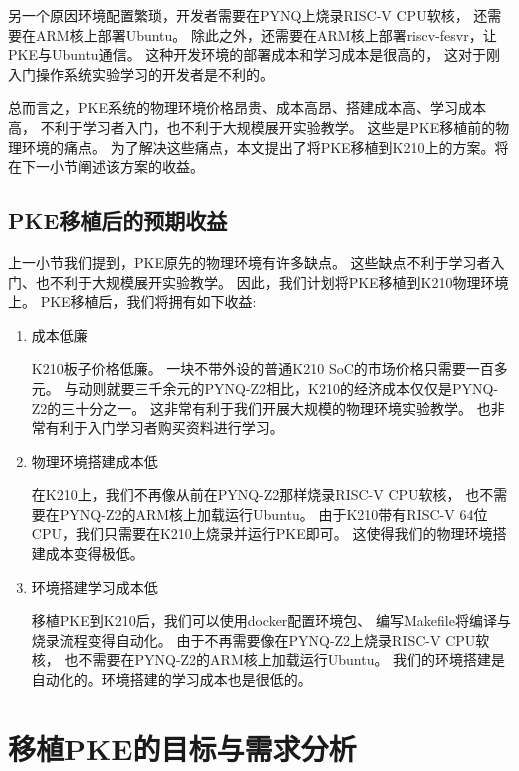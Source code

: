 另一个原因环境配置繁琐，开发者需要在PYNQ上烧录RISC-V CPU软核，
还需要在ARM核上部署Ubuntu。
除此之外，还需要在ARM核上部署riscv-fesvr，让PKE与Ubuntu通信。
这种开发环境的部署成本和学习成本是很高的，
这对于刚入门操作系统实验学习的开发者是不利的。

总而言之，PKE系统的物理环境价格昂贵、成本高昂、搭建成本高、学习成本高，
不利于学习者入门，也不利于大规模展开实验教学。
这些是PKE移植前的物理环境的痛点。
为了解决这些痛点，本文提出了将PKE移植到K210上的方案。将在下一小节阐述该方案的收益。

\subsection{PKE移植后的预期收益}

上一小节我们提到，PKE原先的物理环境有许多缺点。
这些缺点不利于学习者入门、也不利于大规模展开实验教学。
因此，我们计划将PKE移植到K210物理环境上。
PKE移植后，我们将拥有如下收益:

\begin{enumerate}
    \item 成本低廉
    
    K210板子价格低廉。
    一块不带外设的普通K210 SoC的市场价格只需要一百多元。
    与动则就要三千余元的PYNQ-Z2相比，K210的经济成本仅仅是PYNQ-Z2的三十分之一。
    这非常有利于我们开展大规模的物理环境实验教学。
    也非常有利于入门学习者购买资料进行学习。

    \item 物理环境搭建成本低
    
    在K210上，我们不再像从前在PYNQ-Z2那样烧录RISC-V CPU软核，
    也不需要在PYNQ-Z2的ARM核上加载运行Ubuntu。
    由于K210带有RISC-V 64位CPU，我们只需要在K210上烧录并运行PKE即可。
    这使得我们的物理环境搭建成本变得极低。

    \item 环境搭建学习成本低
    
    移植PKE到K210后，我们可以使用docker配置环境包、
    编写Makefile将编译与烧录流程变得自动化。
    由于不再需要像在PYNQ-Z2上烧录RISC-V CPU软核，
    也不需要在PYNQ-Z2的ARM核上加载运行Ubuntu。
    我们的环境搭建是自动化的。环境搭建的学习成本也是很低的。

\end{enumerate}


\section{移植PKE的目标与需求分析}

